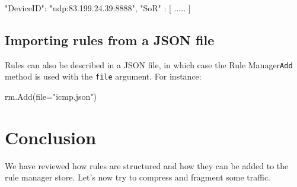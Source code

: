 \begin{termc}[backgroundcolor=\color{yellow}, basicstyle=\ttfamily\small, escapechar=@]
{
    "DeviceID": "udp:83.199.24.39:8888",
    "SoR" : [ ..... ]
}
\end{termc}

\subsection{Importing rules from a JSON file}

Rules can also be described in a JSON file, in which case the Rule Manager\texttt{Add} method is used with the \texttt{file} argument. For instance:

\begin{termc}[backgroundcolor=\color{palerod}, basicstyle=\ttfamily\small, escapechar=@, language=Python]
rm.Add(file="icmp.json")
\end{termc}

\section{Conclusion}

We have reviewed how rules are structured and how they can be added to the rule manager store. Let's now try to compress and fragment some traffic.

